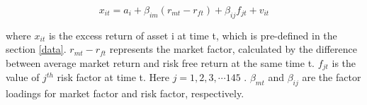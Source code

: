 \[  x_{it} = a_i + \beta_{im}(r_{mt} - r_{ft}) + \beta_{ij}f_{jt} + v_{it}  \]

where $x_{it}$ is the excess return of asset i at time t, which is pre-defined in the section \ref{data}.
$r_{mt} - r_{ft}$ represents the market factor, calculated by the difference between average market return and risk free return at the same time t.
$f_{jt}$ is the value of $j^{th}$ risk factor  at time t. 
Here $j = 1, 2, 3,\cdots 145$ . 
$\beta_{mt}$ and $\beta_{ij}$ are the factor loadings for market factor and risk factor, respectively.








%
%
%